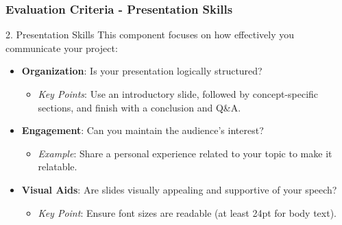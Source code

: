 \documentclass{beamer}
\begin{document}
\begin{frame}[fragile]
    \frametitle{Evaluation Criteria - Presentation Skills}
    \begin{block}{2. Presentation Skills}
        This component focuses on how effectively you communicate your project:
        \begin{itemize}
            \item \textbf{Organization}: Is your presentation logically structured?
            \begin{itemize}
                \item \textit{Key Points}: Use an introductory slide, followed by concept-specific sections, and finish with a conclusion and Q\&A.
            \end{itemize}

            \item \textbf{Engagement}: Can you maintain the audience's interest?
            \begin{itemize}
                \item \textit{Example}: Share a personal experience related to your topic to make it relatable.
            \end{itemize}

            \item \textbf{Visual Aids}: Are slides visually appealing and supportive of your speech?
            \begin{itemize}
                \item \textit{Key Point}: Ensure font sizes are readable (at least 24pt for body text).
            \end{itemize}
        \end{itemize}
    \end{block}
\end{frame}
\end{document}
